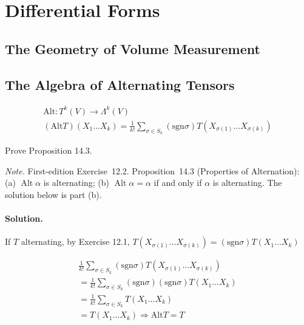 \section{Differential Forms}


\subsection*{ The Geometry of Volume Measurement}

\subsection*{ The Algebra of Alternating Tensors }

\[
\begin{gathered}
  \text{Alt}: T^k(V) \to \Lambda^k(V) \\ 
  (\text{Alt}{T})(X_1 \dots X_k) = \frac{1}{k!} \sum_{ \sigma \in S_k} (\text{sgn}{\sigma}) T(X_{\sigma{(1)}} \dots X_{\sigma{(k)} } )
\end{gathered}
\]



\begin{exercise}
Prove Proposition 14.3.
\end{exercise}
\noindent\emph{Note.} First-edition Exercise~12.2. Proposition~14.3 (Properties of Alternation): (a) $\operatorname{Alt}\alpha$ is alternating; (b) $\operatorname{Alt}\alpha=\alpha$ if and only if $\alpha$ is alternating. The solution below is part (b).
\paragraph{Solution.} If $T$ alternating, by Exercise 12.1, $T(X_{\sigma(1)} \dots X_{\sigma{(k)} } ) = (\text{sgn}{\sigma})T(X_1 \dots X_k)$

\[
\begin{gathered}
  \frac{1}{k!} \sum_{\sigma \in S_k} (\text{sgn}{\sigma}) T(X_{\sigma{(1)} } \dots X_{\sigma{(k)} } ) \\
  = \frac{1}{k!} \sum_{\sigma \in S_k} (\text{sgn}{\sigma})(\text{sgn}{\sigma}) T(X_1 \dots X_k) \\
  = \frac{1}{k!} \sum_{\sigma \in S_k} T(X_1 \dots X_k) \\
  = T(X_1 \dots X_k) \Longrightarrow \text{Alt}{T} = T
\end{gathered}
\]  



